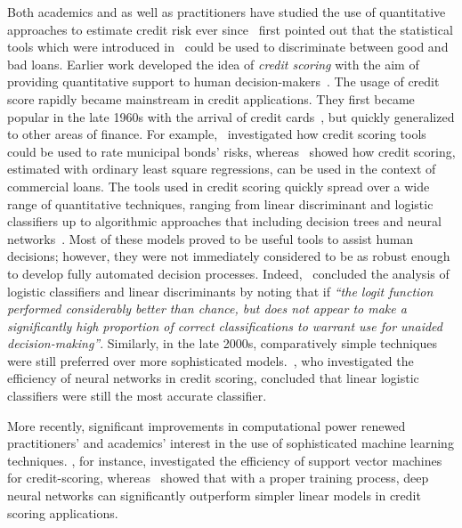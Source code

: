 \documentclass[12pt]{article} %
\begin{document}
Both academics and as well as practitioners have studied the use of quantitative approaches to estimate credit risk ever since~\cite{durand1941risk} first pointed out that the statistical tools which were introduced in~\cite{fisher1936use} could be used to discriminate between good and bad loans. Earlier work developed the idea of \textit{credit scoring} with the aim of providing quantitative support to human decision-makers~\citep[see, e.g.,][]{rosenberg1994quantitative,hand1997statistical,thomas2000survey}. The usage of credit score rapidly became mainstream in credit applications. They first became popular in the late 1960s with the arrival of credit cards~\citep{thomas2000survey}, but quickly generalized to other areas of finance. For example,~\cite{carleton1969statistical} investigated how credit scoring tools could be used to rate municipal bonds' risks, whereas~\cite{orgler1970credit} showed how credit scoring, estimated with ordinary least square regressions, can be used in the context of commercial loans. 
The tools used in credit scoring quickly spread over a wide range of quantitative techniques, ranging from linear discriminant and logistic classifiers up to algorithmic approaches that including decision trees and neural networks~\citep[see, e.g.,][]{rosenberg1994quantitative,bastani2016measuring,hand1997statistical,thomas2000survey}. 
Most of these models proved to be useful tools to assist human decisions; however, they were not immediately considered to be as robust enough to develop fully automated decision processes. 
Indeed,~\cite{wiginton1980note} concluded the analysis of logistic classifiers and linear discriminants by noting that if \textit{``the logit function performed considerably better than chance, but does not appear to make a significantly high proportion of correct classifications to warrant use for unaided decision-making''}. Similarly, in the late 2000s, comparatively simple techniques were still preferred over more sophisticated models.~\cite{west2000neural}, who investigated the efficiency of neural networks in credit scoring, concluded that linear logistic classifiers were still the most accurate classifier. 

More recently, significant improvements in computational power renewed practitioners' and academics' interest in the use of sophisticated machine learning techniques. \cite{huang2007credit}, for instance, investigated the efficiency of support vector machines for credit-scoring, whereas~\cite{gao2006credit} showed that with a proper training process, deep neural networks can significantly outperform simpler linear models in credit scoring applications. 
\end{document}
